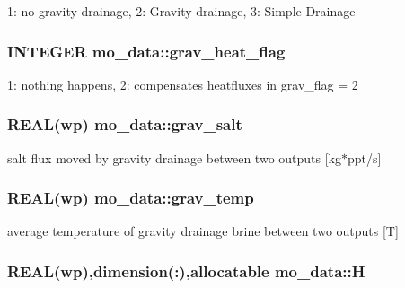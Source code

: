 1: no gravity drainage, 2: Gravity drainage, 3: Simple Drainage 

\hypertarget{namespacemo__data_aab5e39e0b6060d7ef40979d070b89dca}{
\subsubsection[{grav\_\-heat\_\-flag}]{\setlength{\rightskip}{0pt plus 5cm}INTEGER {\bf mo\_\-data::grav\_\-heat\_\-flag}}}
\label{namespacemo__data_aab5e39e0b6060d7ef40979d070b89dca}


1: nothing happens, 2: compensates heatfluxes in grav\_\-flag = 2 

\hypertarget{namespacemo__data_a084bb9d2856cdd8a9253f7790ac09b66}{
\subsubsection[{grav\_\-salt}]{\setlength{\rightskip}{0pt plus 5cm}REAL(wp) {\bf mo\_\-data::grav\_\-salt}}}
\label{namespacemo__data_a084bb9d2856cdd8a9253f7790ac09b66}


salt flux moved by gravity drainage between two outputs \mbox{[}kg$\ast$ppt/s\mbox{]} 

\hypertarget{namespacemo__data_afd51dbc5cf51bbdec73b0c543d963da8}{
\subsubsection[{grav\_\-temp}]{\setlength{\rightskip}{0pt plus 5cm}REAL(wp) {\bf mo\_\-data::grav\_\-temp}}}
\label{namespacemo__data_afd51dbc5cf51bbdec73b0c543d963da8}


average temperature of gravity drainage brine between two outputs \mbox{[}T\mbox{]} 

\hypertarget{namespacemo__data_ad27ff95f4bfe7ed6f5643d3953a9310e}{
\subsubsection[{H}]{\setlength{\rightskip}{0pt plus 5cm}REAL(wp),dimension(:),allocatable {\bf mo\_\-data::H}}}
\label{namespacemo__data_ad27ff95f4bfe7ed6f5643d3953a9310e}



